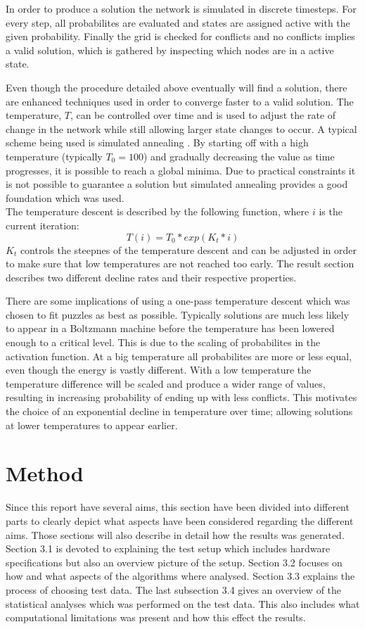\documentclass[a4paper,11pt]{kth-mag}
\begin{document}
In order to produce a solution the network is simulated in discrete timesteps.
For every step, all probabilites are evaluated and states are assigned active with the given probability.
Finally the grid is checked for conflicts and no conflicts implies a valid solution, which is gathered by inspecting which nodes are in a active state.

Even though the procedure detailed above eventually will find a solution, there are enhanced techniques used in order to converge faster to a valid solution.
The temperature, $T$, can be controlled over time and is used to adjust the rate of change in the network while still allowing larger state changes to occur.
A typical scheme being used is simulated annealing \cite{simulatedAnnealing}.
By starting off with a high temperature (typically $T_0 = 100$) and gradually decreasing the value as time progresses, it is possible to reach a global minima.
Due to practical constraints it is not possible to guarantee a solution but simulated annealing provides a good foundation which was used.\\

The temperature descent is described by the following function, where $i$ is the current iteration:
\[
T(i) = T_0 * exp(K_t * i)
\]
$K_t$ controls the steepnes of the temperature descent and can be adjusted in order to make sure that low temperatures are not reached too early.
The result section describes two different decline rates and their respective properties.

There are some implications of using a one-pass temperature descent which was chosen to fit puzzles as best as possible.
Typically solutions are much less likely to appear in a Boltzmann machine before the temperature has been lowered enough to a critical level.
This is due to the scaling of probabilites in the activation function.
At a big temperature all probabilites are more or less equal, even though the energy is vastly different.
With a low temperature the temperature difference will be scaled and produce a wider range of values, resulting in increasing probability of ending up with less conflicts.
This motivates the choice of an exponential decline in temperature over time; allowing solutions at lower temperatures to appear earlier.

\chapter{Method}
Since this report have several aims, this section have been divided into different parts to clearly depict what aspects have been considered regarding the different aims. 
Those sections will also describe in detail how the results was generated. 
Section 3.1 is devoted to explaining the test setup which includes hardware specifications but also an overview picture of the setup. 
Section 3.2 focuses on how and what aspects of the algorithms where analysed.
Section 3.3 explains the process of choosing test data.
The last subsection 3.4 gives an overview of the statistical analyses which was performed on the test data.
This also includes what computational limitations was present and how this effect the results. 
\end{document}
